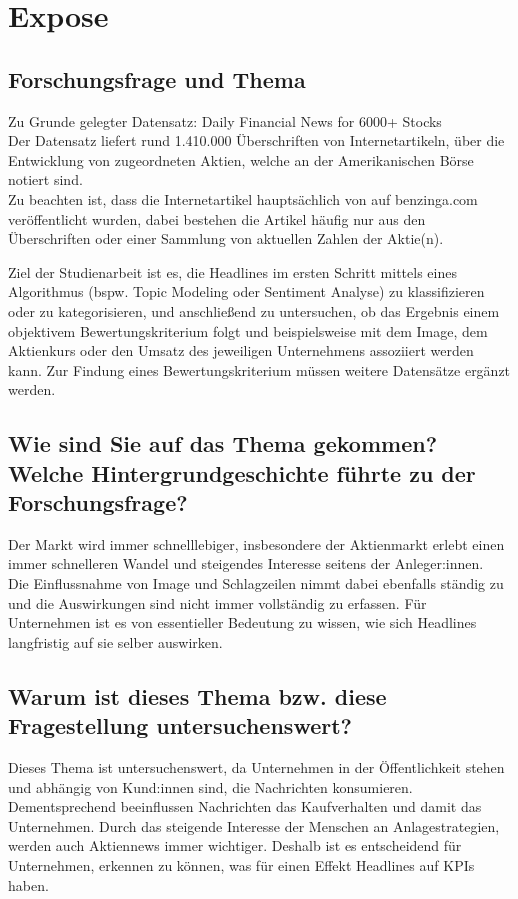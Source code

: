 \chapter*{Expose}
\section*{Forschungsfrage und Thema}

Zu Grunde gelegter Datensatz: 
Daily Financial News for 6000+ Stocks
\citep[see][]{dailyfinancialnews} \\
Der Datensatz liefert rund 1.410.000 Überschriften von Internetartikeln, über die Entwicklung von zugeordneten Aktien, welche an der Amerikanischen Börse notiert sind.\\
Zu beachten ist, dass die Internetartikel hauptsächlich von auf benzinga.com veröffentlicht wurden, dabei bestehen die Artikel häufig nur aus den Überschriften oder einer Sammlung von aktuellen Zahlen der Aktie(n).

Ziel der Studienarbeit ist es, die Headlines im ersten Schritt mittels eines Algorithmus (bspw. Topic Modeling oder Sentiment Analyse) zu klassifizieren oder zu kategorisieren, und anschließend zu untersuchen, ob das Ergebnis einem objektivem Bewertungskriterium folgt und beispielsweise mit dem Image, dem Aktienkurs oder den Umsatz des jeweiligen Unternehmens assoziiert werden kann.
Zur Findung eines Bewertungskriterium müssen weitere Datensätze ergänzt werden.

\section*{Wie sind Sie auf das Thema gekommen? Welche Hintergrundgeschichte führte zu der Forschungsfrage?}
Der Markt wird immer schnelllebiger, insbesondere der Aktienmarkt erlebt einen immer schnelleren Wandel und steigendes Interesse seitens der Anleger:innen.\\
Die Einflussnahme von Image und Schlagzeilen nimmt dabei ebenfalls ständig zu und die Auswirkungen sind nicht immer vollständig zu erfassen.
Für Unternehmen ist es von essentieller Bedeutung zu wissen, wie sich Headlines langfristig auf sie selber auswirken. 

\section*{Warum ist dieses Thema bzw. diese Fragestellung untersuchenswert?}
Dieses Thema ist untersuchenswert, da Unternehmen in der Öffentlichkeit stehen und abhängig von Kund:innen sind, die Nachrichten konsumieren. Dementsprechend beeinflussen Nachrichten das Kaufverhalten und damit das Unternehmen. Durch das steigende Interesse der Menschen an Anlagestrategien, werden auch Aktiennews immer wichtiger. Deshalb ist es entscheidend für Unternehmen, erkennen zu können, was für einen Effekt Headlines auf KPIs haben.

